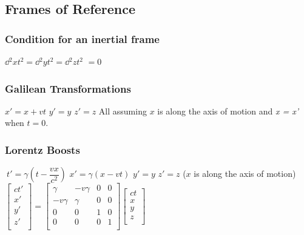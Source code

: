 \subsection{Frames of Reference}		

\subsubsection{Condition for an inertial frame}	
\begin{itemize}
\itemt \( \dd{^2 x}{t^2} = \dd{^2 y}{t^2} = \dd{^2 z}{t^2} \) \normalsize \(= 0\)
\end{itemize}		 

\subsubsection[GT]{Galilean Transformations}				 
\begin{itemize}
\itemt \(x' = x + vt\)
\itemt \(y' = y\)
\itemt \(z' = z\)
\itemt All assuming $x$ is along the axis of motion and \textit{x = x'} when $t = 0$.	
\end{itemize}

\subsubsection{Lorentz Boosts}				
\begin{itemize}
\itemt \( \ t' = \gamma \left(t-\dfrac{vx}{c^2}\right)\)
\itemt \( x' = \gamma (x-vt)\)
\itemt \( y' = y \)
\itemt \( z' = z \)
\itemt ($x$ is along the axis of motion)					
\itemt \(					
\begin{bmatrix}
ct' \\
x' \\
y' \\
z' \\
\end{bmatrix} =
\begin{bmatrix}
\gamma 		&-v\gamma	&0	&0 	\\
-v\gamma 	&\gamma		&0	&0	\\
0 			&0			&1	&0	\\
0 			&0			&0	&1	\\
\end{bmatrix}
\begin{bmatrix}
ct \\
x \\
y \\
z \\
\end{bmatrix} \)
\end{itemize}		


